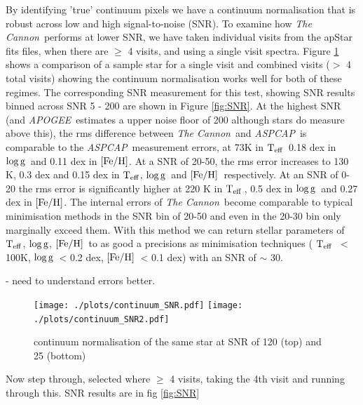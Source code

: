 \documentclass[12pt, preprint]{aastex}
\newcommand{\teff}{\mbox{$\rm T_{eff}$}}
\newcommand{\feh}{\mbox{$\rm [Fe/H]$}}
\newcommand{\logg}{\mbox{$\rm \log g$}}
\newcommand{\tc}{\textsl{The Cannon}}
\newcommand{\apogee}{\textsl{APOGEE}}
\newcommand{\aspcap}{\textsl{ASPCAP}}
\begin{document}
By identifying 'true' continuum pixels we have a continuum normalisation that is robust across low and high signal-to-noise (SNR). To examine how \tc\ performs at lower SNR, we have taken individual visits from the apStar fits files, when there are $\ge$ 4 visits, and using a single visit spectra. Figure \ref{fig:lowsnr} shows a comparison of a sample star for a single visit and combined visits ($>$ 4 total visits) showing the continuum normalisation works well for both of these regimes. The corresponding SNR measurement for this test,  showing SNR results binned  across SNR 5 - 200 are shown in Figure \ref{fig:SNR}.  At the highest SNR (and \apogee\ estimates a upper noise floor of 200 although stars do measure above this), the rms difference between \tc\ and \aspcap\ is comparable to the \aspcap\ measurement errors, at 73K in \teff\, 0.18 dex in \logg\ and 0.11 dex in \feh.  At a SNR of 20-50, the rms error increases to 130 K, 0.3 dex and 0.15 dex in \teff, \logg\ and \feh\, respectively. At an SNR of 0-20 the rms error is significantly higher at 220 K in \teff\,, 0.5 dex in \logg\ and 0.27 dex in \feh. The internal errors of \tc\ become comparable to typical minimisation methods in the SNR bin of 20-50 and even in the 20-30 bin only marginally exceed them. With this method we can return stellar parameters of \teff, \logg, \feh\ to as good a precisions as minimisation techniques ( \teff\ $<$ 100K, \logg\ < 0.2 dex, \feh\ < 0.1 dex) with an SNR of $\sim$ 30. 

 - need to understand errors better. 
 
 
\begin{figure}[h!]
  \texttt{[image: ./plots/continuum\_SNR.pdf]}
    \texttt{[image: ./plots/continuum\_SNR2.pdf]}
  
\caption{continuum normalisation of the same star at SNR of 120 (top) and 25 (bottom) }
\label{fig:lowsnr}
\end{figure}

Now step through, selected where $\ge$ 4 visits, taking the 4th visit and running through this. SNR results are in fig \ref{fig:SNR}
\end{document}
